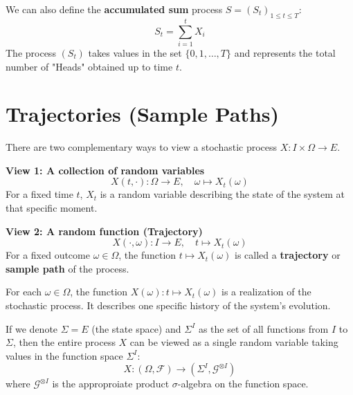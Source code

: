 We can also define the \textbf{accumulated sum} process $S = (S_t)_{1 \leq t \leq T}$:
\[
S_t = \sum_{i=1}^t X_i
\]
The process $(S_t)$ takes values in the set $\{0, 1, \dots, T\}$ and represents the total number of "Heads" obtained up to time $t$.

\section{Trajectories (Sample Paths)}

There are two complementary ways to view a stochastic process $X: I \times \Omega \to E$.

\textbf{View 1: A collection of random variables}
\[
X(t, \cdot) : \Omega \to E, \quad \omega \mapsto X_t(\omega)
\]
For a fixed time $t$, $X_t$ is a random variable describing the state of the system at that specific moment.

\textbf{View 2: A random function (Trajectory)}
\[
X(\cdot, \omega) : I \to E, \quad t \mapsto X_t(\omega)
\]
For a fixed outcome $\omega \in \Omega$, the function $t \mapsto X_t(\omega)$ is called a \textbf{trajectory} or \textbf{sample path} of the process.

\begin{definition}[Trajectory]
For each $\omega \in \Omega$, the function $X(\omega): t \mapsto X_t(\omega)$ is a realization of the stochastic process. It describes one specific history of the system's evolution.
\end{definition}

If we denote $\Sigma = E$ (the state space) and $\Sigma^I$ as the set of all functions from $I$ to $\Sigma$, then the entire process $X$ can be viewed as a single random variable taking values in the function space $\Sigma^I$:
\[
X: (\Omega, \mathcal{F}) \to (\Sigma^I, \mathcal{G}^{\otimes I})
\]
where $\mathcal{G}^{\otimes I}$ is the approproiate product $\sigma$-algebra on the function space.
